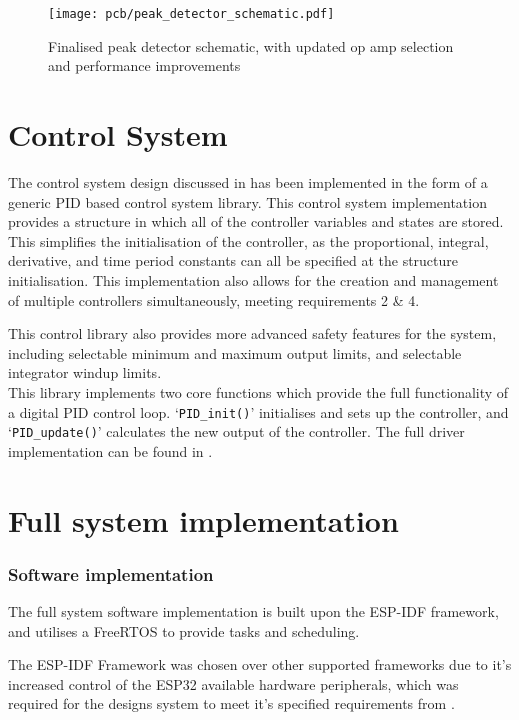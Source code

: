 \begin{figure}[!h]
    \centering
    \texttt{[image: pcb/peak\_detector\_schematic.pdf]}
    \caption{Finalised peak detector schematic, with updated op amp selection and performance improvements}
    \label{F:final_peak_detector}
\end{figure}


\section{Control System}\label{S:control_impl}

The control system design discussed in  has been implemented in the form of a generic PID based control system library. This control system implementation provides a structure in which all of the controller variables and states are stored. This simplifies the initialisation of the controller, as the proportional, integral, derivative, and time period constants can all be specified at the structure initialisation. This implementation also allows for the creation and management of multiple controllers simultaneously, meeting requirements 2 \& 4. 

This control library also provides more advanced safety features for the system, including selectable minimum and maximum output limits, and selectable integrator windup limits.\\

This library implements two core functions which provide the full functionality of a digital PID control loop. `\lstinline{PID_init()}' initialises and sets up the controller, and `\lstinline{PID_update()}' calculates the new output of the controller. The full driver implementation can be found in .


\section{Full system implementation}

\subsubsection*{Software implementation}

The full system software implementation is built upon the ESP-IDF framework, and utilises a FreeRTOS to provide tasks and scheduling. 

The ESP-IDF Framework was chosen over other supported frameworks due to it's increased control of the ESP32 available hardware peripherals, which was required for the designs system to meet it's specified requirements from . 

